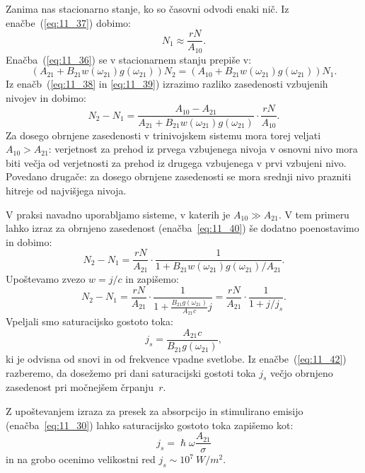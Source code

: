 Zanima nas stacionarno stanje, ko so časovni odvodi enaki nič. 
Iz enačbe~(\ref{eq:11_37}) dobimo:
\begin{equation}
N_1 \approx \frac{rN}{A_{10}}.
\label{eq:11_38}
\end{equation}
Enačba~(\ref{eq:11_36}) se v stacionarnem stanju prepiše v:
\begin{equation}
\left(A_{21}+ B_{21}w(\omega_{21})g(\omega_{21})\right)N_2 = 
\left(A_{10}+ B_{21}w(\omega_{21})g(\omega_{21})\right)N_1.
\label{eq:11_39}
\end{equation}
Iz enačb~(\ref{eq:11_38} in \ref{eq:11_39}) izrazimo razliko 
zasedenosti vzbujenih nivojev in dobimo:
\begin{equation}
N_2-N_1 = \frac{A_{10}-A_{21}}{A_{21} + B_{21}w(\omega_{21})g(\omega_{21})}
\cdot \frac{rN}{A_{10}}.
\label{eq:11_40}
\end{equation}
Za dosego obrnjene zasedenosti v trinivojskem sistemu mora torej 
veljati $A_{10}>A_{21}$: verjetnost za prehod iz prvega vzbujenega nivoja v 
osnovni nivo mora biti večja od verjetnosti za prehod iz 
drugega vzbujenega v prvi vzbujeni nivo. Povedano drugače: 
za dosego obrnjene zasedenosti se mora srednji nivo 
prazniti hitreje od najvišjega nivoja. 

V praksi navadno uporabljamo sisteme, v katerih je $A_{10}\gg A_{21}$.
V tem primeru lahko izraz za obrnjeno zasedenost (enačba~\ref{eq:11_40}) 
še dodatno poenostavimo in dobimo:
\begin{equation}
N_2-N_1 = \frac{rN}{A_{21}}\cdot\frac{1}{1+B_{21}w(\omega_{21})g(\omega_{21})/A_{21}}.
\label{eq:11_41}
\end{equation}
Upoštevamo zvezo $w = j/c$ in zapišemo:
\begin{equation}
N_2-N_1 = \frac{rN}{A_{21}}\cdot\frac{1}{1+\frac{B_{21}g(\omega_{21})}{A_{21}c}j} = 
\frac{rN}{A_{21}}\cdot \frac{1}{1+j/j_s}.
\label{eq:11_42}
\end{equation}
Vpeljali smo saturacijsko gostoto toka:
\begin{equation}
j_s = \frac{A_{21}c}{B_{21}g(\omega_{21})},
\label{eq:11_42a}
\end{equation}
ki je odvisna od snovi in od frekvence vpadne svetlobe. Iz enačbe~(\ref{eq:11_42}) razberemo, 
da dosežemo pri  dani saturacijski gostoti toka $j_s$ večjo obrnjeno zasedenost
pri močnejšem črpanju~$r$.

Z upoštevanjem izraza za presek za absorpcijo in stimulirano emisijo 
(enačba~\ref{eq:11_30}) lahko saturacijsko gostoto toka zapišemo kot:
\begin{equation}
j_s = \hslash \omega \frac{A_{21}}{\sigma}
\label{eq:11_42b}
\end{equation}
in na grobo ocenimo velikostni red $j_s \sim 10^7~\si{W/m^2}$. 

